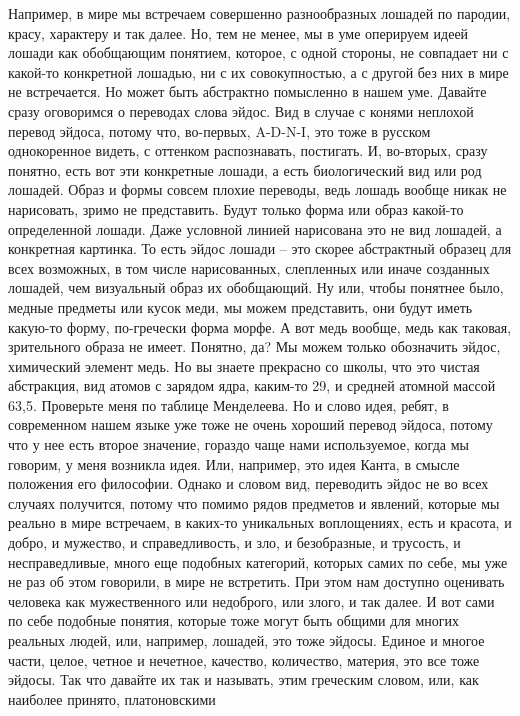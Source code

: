 Например, в мире мы встречаем совершенно разнообразных лошадей по пародии,
красу, характеру и так далее. Но, тем не менее, мы в уме оперируем идеей лошади
как обобщающим понятием, которое, с одной стороны, не совпадает ни с какой-то
конкретной лошадью, ни с их совокупностью, а с другой без них в мире не
встречается. Но может быть абстрактно помысленно в нашем уме. Давайте сразу
оговоримся о переводах слова эйдос. Вид в случае с конями неплохой перевод
эйдоса, потому что, во-первых, A-D-N-I, это тоже в русском однокоренное видеть,
с оттенком распознавать, постигать. И, во-вторых, сразу понятно, есть вот эти
конкретные лошади, а есть биологический вид или род лошадей. Образ и формы
совсем плохие переводы, ведь лошадь вообще никак не нарисовать, зримо не
представить. Будут только форма или образ какой-то определенной лошади. Даже
условной линией нарисована это не вид лошадей, а конкретная картинка. То есть
эйдос лошади – это скорее абстрактный образец для всех возможных, в том числе
нарисованных, слепленных или иначе созданных лошадей, чем визуальный образ их
обобщающий. Ну или, чтобы понятнее было, медные предметы или кусок меди, мы
можем представить, они будут иметь какую-то форму, по-гречески форма морфе. А
вот медь вообще, медь как таковая, зрительного образа не имеет. Понятно, да? Мы
можем только обозначить эйдос, химический элемент медь. Но вы знаете прекрасно
со школы, что это чистая абстракция, вид атомов с зарядом ядра, каким-то 29, и
средней атомной массой 63,5. Проверьте меня по таблице Менделеева. Но и слово
идея, ребят, в современном нашем языке уже тоже не очень хороший перевод эйдоса,
потому что у нее есть второе значение, гораздо чаще нами используемое, когда мы
говорим, у меня возникла идея. Или, например, это идея Канта, в смысле положения
его философии. Однако и словом вид, переводить эйдос не во всех случаях
получится, потому что помимо рядов предметов и явлений, которые мы реально в
мире встречаем, в каких-то уникальных воплощениях, есть и красота, и добро, и
мужество, и справедливость, и зло, и безобразные, и трусость, и несправедливые,
много еще подобных категорий, которых самих по себе, мы уже не раз об этом
говорили, в мире не встретить. При этом нам доступно оценивать человека как
мужественного или недоброго, или злого, и так далее. И вот сами по себе подобные
понятия, которые тоже могут быть общими для многих реальных людей, или,
например, лошадей, это тоже эйдосы. Единое и многое части, целое, четное и
нечетное, качество, количество, материя, это все тоже эйдосы. Так что давайте их
так и называть, этим греческим словом, или, как наиболее принято, платоновскими
